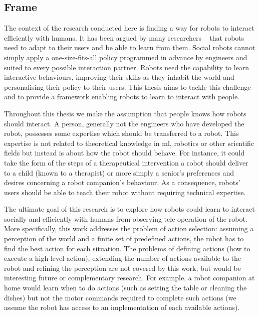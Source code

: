 \subsection{Frame}

The context of the research conducted here is finding a way for robots to interact efficiently with humans. It has been argued by many researchers ~\citep{dautenhahn2004robots,billard2008robot} that robots need to adapt to their users and be able to learn from them. Social robots cannot simply apply a one-size-fits-all policy programmed in advance by engineers and suited to every possible interaction partner. Robots need the capability to learn interactive behaviours, improving their skills as they inhabit the world and personalising their policy to their users. This thesis aims to tackle this challenge and to provide a framework enabling robots to learn to interact with people.

Throughout this thesis we make the assumption that people knows how robots should interact. A person, generally not the engineers who have developed the robot, possesses some expertise which should be transferred to a robot. This expertise is not related to theoretical knowledge in \gls{ml}, robotics or other scientific fields but instead is about how the robot should behave. For instance,  it could take the form of the steps of a therapeutical intervention a robot should deliver to a child (known to a therapist) or more simply a senior's preferences and desires concerning a robot companion's behaviour. As a consequence, robots' users should be able to teach their robot without requiring technical expertise.

The ultimate goal of this research is to explore how robots could learn to interact socially and efficiently with humans from observing tele-operation of the robot. More specifically, this work addresses the problem of action selection: assuming a perception of the world and a finite set of predefined actions, the robot has to find the best action for each situation. The problems of defining actions (how to execute a high level action), extending the number of actions available to the robot and refining the perception are not covered by this work, but would be interesting future or complementary research. For example, a robot companion at home would learn when to do actions (such as setting the table or cleaning the dishes) but not the motor commands required to complete such actions (we assume the robot has access to an implementation of each available actions).

